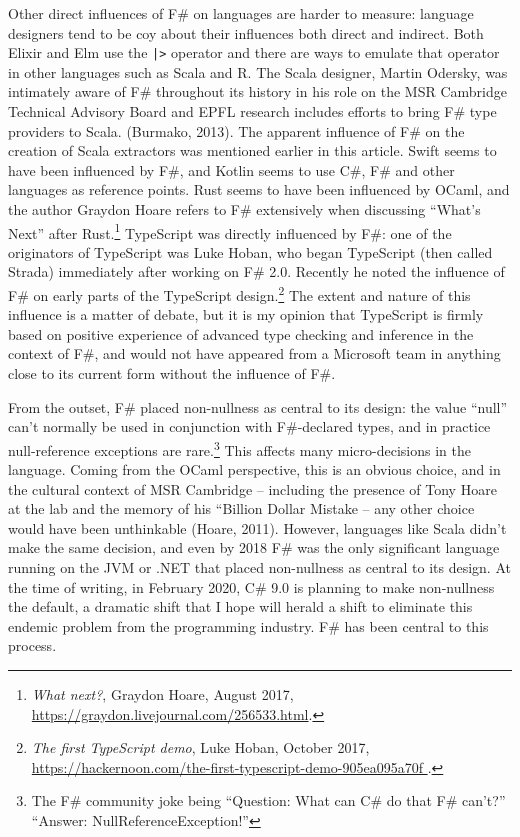 \documentclass[acmsmall,review]{acmart}\settopmatter{printfolios=true,printccs=false,printacmref=false}
\begin{document}
Other direct influences of F\# on languages are harder to measure: language designers tend to be coy about their
influences both direct and indirect. Both Elixir and Elm use the \texttt{|>} operator and there are ways to emulate that operator
in other languages such as Scala and R. The Scala designer, Martin Odersky, was intimately aware of F\# throughout
its history in his role on the MSR Cambridge Technical Advisory Board and EPFL research includes efforts to
bring F\# type providers to Scala. (Burmako, 2013).  The apparent influence of F\# on the
creation of Scala extractors was mentioned earlier in this article. Swift seems to have been influenced
by F\#, and Kotlin seems to use C\#, F\# and other languages as reference points.  Rust seems to have been
influenced by OCaml, and the author Graydon Hoare refers to F\# extensively when discussing “What’s Next” after
Rust.\footnote{\textit{What next?}, Graydon Hoare, August 2017, \url{https://graydon.livejournal.com/256533.html}.}
TypeScript was directly influenced by F\#: one of the originators of TypeScript was
Luke Hoban, who began TypeScript (then called Strada) immediately after working on F\# 2.0. Recently
he noted the influence of F\# on early parts of the TypeScript
design.\footnote{\textit{The first TypeScript demo}, Luke Hoban, October 2017, \url{https://hackernoon.com/the-first-typescript-demo-905ea095a70f }.} The
extent and nature of this influence is a matter of debate, but it is my opinion that TypeScript is firmly based on positive experience of advanced type checking and inference
in the context of F\#, and would not have appeared from a Microsoft team in anything close to its current form without the influence of F\#.

From the outset, F\# placed non-nullness as central to its design: the value “null” can’t normally be used in conjunction
with F\#-declared types, and in practice null-reference exceptions are rare.\footnote{The F\# community joke being “Question: What can C\# do that F\# can’t?” “Answer: NullReferenceException!”}   This affects many micro-decisions in the
language. Coming from the OCaml perspective, this is an obvious choice, and in the cultural context of MSR
Cambridge – including the presence of Tony Hoare at the lab and the memory of his “Billion Dollar Mistake – any
other choice would have been unthinkable (Hoare, 2011).  However, languages like Scala didn’t make the same
decision, and even by 2018 F\# was the only significant language running on the JVM or .NET that placed non-nullness
as central to its design. At the time of writing, in February 2020, C\# 9.0 is planning to make non-nullness the
default, a dramatic shift that I hope will herald a shift to eliminate this endemic problem from the programming industry. F\# has been central to this process.
\end{document}
